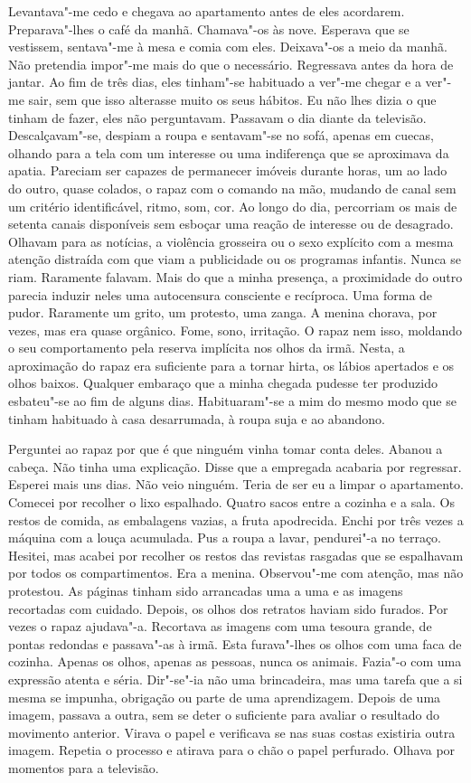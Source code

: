Levantava"-me cedo e chegava ao apartamento antes de eles acordarem.
Preparava"-lhes o café da manhã. Chamava"-os às nove. Esperava que se
vestissem, sentava"-me à mesa e comia com eles. Deixava"-os a meio da
manhã. Não pretendia impor"-me mais do que o necessário. Regressava
antes da hora de jantar. Ao fim de três dias, eles tinham"-se habituado
a ver"-me chegar e a ver"-me sair, sem que isso alterasse muito os seus
hábitos. Eu não lhes dizia o que tinham de fazer, eles não perguntavam.
Passavam o dia diante da televisão. Descalçavam"-se, despiam a roupa e
sentavam"-se no sofá, apenas em cuecas, olhando para a tela com um
interesse ou uma indiferença que se aproximava da apatia. Pareciam ser
capazes de permanecer imóveis durante horas, um ao lado do outro, quase
colados, o rapaz com o comando na mão, mudando de canal sem um critério
identificável, ritmo, som, cor. Ao longo do dia, percorriam os mais de
setenta canais disponíveis sem esboçar uma reação de interesse ou de
desagrado. Olhavam para as notícias, a violência grosseira ou o sexo
explícito com a mesma atenção distraída com que viam a publicidade ou os
programas infantis. Nunca se riam. Raramente falavam. Mais do que a
minha presença, a proximidade do outro parecia induzir neles uma
autocensura consciente e recíproca. Uma forma de pudor. Raramente um
grito, um protesto, uma zanga. A menina chorava, por vezes, mas era
quase orgânico. Fome, sono, irritação. O rapaz nem isso, moldando o seu
comportamento pela reserva implícita nos olhos da irmã. Nesta, a
aproximação do rapaz era suficiente para a tornar hirta, os lábios
apertados e os olhos baixos. Qualquer embaraço que a minha chegada
pudesse ter produzido esbateu"-se ao fim de alguns dias. Habituaram"-se
a mim do mesmo modo que se tinham habituado à casa desarrumada, à roupa
suja e ao abandono.

Perguntei ao rapaz por que é que ninguém vinha tomar conta deles. Abanou
a cabeça. Não tinha uma explicação. Disse que a empregada acabaria por
regressar. Esperei mais uns dias. Não veio ninguém. Teria de ser eu a
limpar o apartamento. Comecei por recolher o lixo espalhado. Quatro
sacos entre a cozinha e a sala. Os restos de comida, as embalagens
vazias, a fruta apodrecida. Enchi por três vezes a máquina com a louça
acumulada. Pus a roupa a lavar, pendurei"-a no terraço. Hesitei, mas
acabei por recolher os restos das revistas rasgadas que se espalhavam
por todos os compartimentos. Era a menina. Observou"-me com atenção, mas
não protestou. As páginas tinham sido arrancadas uma a uma e as imagens
recortadas com cuidado. Depois, os olhos dos retratos haviam sido
furados. Por vezes o rapaz ajudava"-a. Recortava as imagens com uma
tesoura grande, de pontas redondas e passava"-as à irmã. Esta
furava"-lhes os olhos com uma faca de cozinha. Apenas os olhos, apenas
as pessoas, nunca os animais. Fazia"-o com uma expressão atenta e séria.
Dir"-se"-ia não uma brincadeira, mas uma tarefa que a si mesma se
impunha, obrigação ou parte de uma aprendizagem. Depois de uma imagem,
passava a outra, sem se deter o suficiente para avaliar o resultado do
movimento anterior. Virava o papel e verificava se nas suas costas
existiria outra imagem. Repetia o processo e atirava para o chão o papel
perfurado. Olhava por momentos para a televisão.


